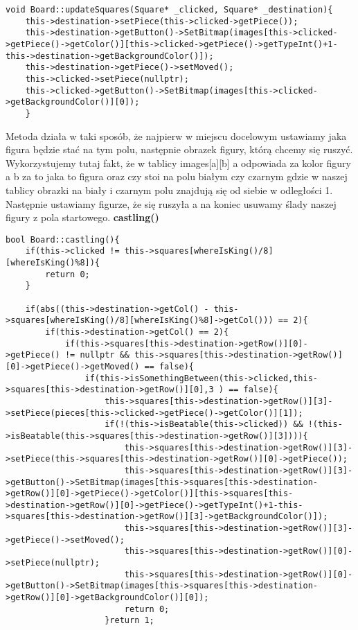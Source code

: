 \documentclass[]{report}
\begin{document}
\begin{flushleft}
\begin{lstlisting}
void Board::updateSquares(Square* _clicked, Square* _destination){
	this->destination->setPiece(this->clicked->getPiece());
	this->destination->getButton()->SetBitmap(images[this->clicked->getPiece()->getColor()][this->clicked->getPiece()->getTypeInt()+1-this->destination->getBackgroundColor()]);
	this->destination->getPiece()->setMoved();
	this->clicked->setPiece(nullptr);
	this->clicked->getButton()->SetBitmap(images[this->clicked->getBackgroundColor()][0]);
	}
\end{lstlisting}
\vspace{\baselineskip}
Metoda działa w taki sposób, że najpierw w miejscu docelowym ustawiamy jaka figura będzie stać na tym polu, następnie obrazek figury, którą chcemy się ruszyć. Wykorzystujemy tutaj fakt, że w tablicy images[a][b] a odpowiada za kolor figury a b za to jaka to figura oraz czy stoi na polu białym czy czarnym gdzie w naszej tablicy obrazki na biały i czarnym polu znajdują się od siebie w odległości 1. Następnie ustawiamy figurze, że się ruszyła a na koniec usuwamy ślady naszej figury z pola startowego.
\vspace{\baselineskip}
\newline
\textbf{castling()}
\begin{lstlisting}
bool Board::castling(){
	if(this->clicked != this->squares[whereIsKing()/8][whereIsKing()%8]){
		return 0;
	}
	
	if(abs((this->destination->getCol() - this->squares[whereIsKing()/8][whereIsKing()%8]->getCol())) == 2){
		if(this->destination->getCol() == 2){
			if(this->squares[this->destination->getRow()][0]->getPiece() != nullptr && this->squares[this->destination->getRow()][0]->getPiece()->getMoved() == false){
				if(this->isSomethingBetween(this->clicked,this->squares[this->destination->getRow()][0],3 ) == false){
					this->squares[this->destination->getRow()][3]->setPiece(pieces[this->clicked->getPiece()->getColor()][1]);
					if(!(this->isBeatable(this->clicked)) && !(this->isBeatable(this->squares[this->destination->getRow()][3]))){
						this->squares[this->destination->getRow()][3]->setPiece(this->squares[this->destination->getRow()][0]->getPiece());
						this->squares[this->destination->getRow()][3]->getButton()->SetBitmap(images[this->squares[this->destination->getRow()][0]->getPiece()->getColor()][this->squares[this->destination->getRow()][0]->getPiece()->getTypeInt()+1-this->squares[this->destination->getRow()][3]->getBackgroundColor()]);
						this->squares[this->destination->getRow()][3]->getPiece()->setMoved();
						this->squares[this->destination->getRow()][0]->setPiece(nullptr);
						this->squares[this->destination->getRow()][0]->getButton()->SetBitmap(images[this->squares[this->destination->getRow()][0]->getBackgroundColor()][0]);
						return 0;
					}return 1;
					

\end{lstlisting}
\end{flushleft}
\end{document}
